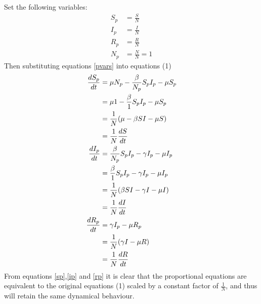 Set the following variables:
\begin{subequations}\label{pvars}
\begin{align}
    S_p &= \frac{S}{N}\\
    I_p &= \frac{I}{N}\\
    R_p &= \frac{R}{N}\\
    N_p &= \frac{N}{N} = 1
\end{align}
\end{subequations}
Then substituting equations \ref{pvars} into equations (1)
\begin{align}
  \frac{dS_p}{dt} &= \mu N_p -\frac{\beta}{N_p} S_p I_p - \mu S_p\nonumber\\
                  &= \mu 1 -\frac{\beta}{1} S_p I_p - \mu S_p\nonumber\\
                  &= \frac{1}{N}(\mu -\beta SI - \mu S)\nonumber\\
                  &= \frac{1}{N} \frac{dS}{dt}\label{sp}\\
  \vspace{8pt}
  \frac{dI_p}{dt} &= \frac{\beta}{N_p} S_p I_p - \gamma I_p - \mu I_p\nonumber\\
                  &= \frac{\beta}{1} S_p I_p - \gamma I_p - \mu I_p\nonumber\\
                  &= \frac{1}{N} (\beta SI - \gamma I - \mu I)\nonumber\\
                  &= \frac{1}{N} \frac{dI}{dt}\label{ip}\\
  \vspace{8pt}
  \frac{dR_p}{dt} &= \gamma I_p - \mu R_p\nonumber\\
                  &= \frac{1}{N} (\gamma I - \mu R)\nonumber\\
                  &= \frac{1}{N} \frac{dR}{dt}\label{rp}
\end{align}
From equations \ref{sp},\ref{ip} and \ref{rp} it is clear that the proportional equations are equivalent to the original equations (1) scaled by a constant factor of $\frac{1}{N}$, and thus will retain the same dynamical behaviour.
